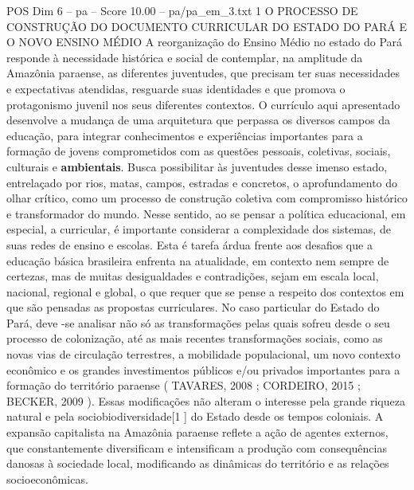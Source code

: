 \begin{textsample}{POS Dim 6 – pa – Score 10.00 – pa/pa\_em\_3.txt}  \label{ex:f6_pos_063}
1 O PROCESSO DE CONSTRUÇÃO DO DOCUMENTO CURRICULAR DO ESTADO DO PARÁ E O NOVO ENSINO MÉDIO A reorganização do Ensino Médio no estado do Pará responde à necessidade histórica e social de contemplar, na amplitude da Amazônia paraense, as diferentes juventudes, que precisam ter suas necessidades e expectativas atendidas, resguarde suas identidades e que promova o protagonismo juvenil nos seus diferentes contextos.
O currículo aqui apresentado desenvolve a mudança de uma arquitetura que perpassa os diversos campos da educação, para integrar conhecimentos e experiências importantes para a formação de jovens comprometidos com as questões pessoais, coletivas, sociais, culturais e \textbf{ambientais}.
Busca possibilitar às juventudes desse imenso estado, entrelaçado por rios, matas, campos, estradas e concretos, o aprofundamento do olhar crítico, como um processo de construção coletiva com compromisso histórico e transformador do mundo.
Nesse sentido, ao se pensar a política educacional, em especial, a curricular, é importante considerar a complexidade dos sistemas, de suas redes de ensino e escolas.
Esta é tarefa árdua frente aos desafios que a educação básica brasileira enfrenta na atualidade, em contexto nem sempre de certezas, mas de muitas desigualdades e contradições, sejam em escala local, nacional, regional e global, o que requer que se pense a respeito dos contextos em que são pensadas as propostas curriculares.
No caso particular do Estado do Pará, deve -se analisar não só as transformações pelas quais sofreu desde o seu processo de colonização, até as mais recentes transformações sociais, como as novas vias de circulação terrestres, a mobilidade populacional, um novo contexto econômico e os grandes investimentos públicos e/ou privados importantes para a formação do território paraense ( TAVARES, 2008 ; CORDEIRO, 2015 ; BECKER, 2009 ).
Essas modificações não alteram o interesse pela grande riqueza natural e pela sociobiodiversidade[1 ] do Estado desde os tempos coloniais.
A expansão capitalista na Amazônia paraense reflete a ação de agentes externos, que constantemente diversificam e intensificam a produção com consequências danosas à sociedade local, modificando as dinâmicas do território e as relações socioeconômicas.

\end{textsample}
